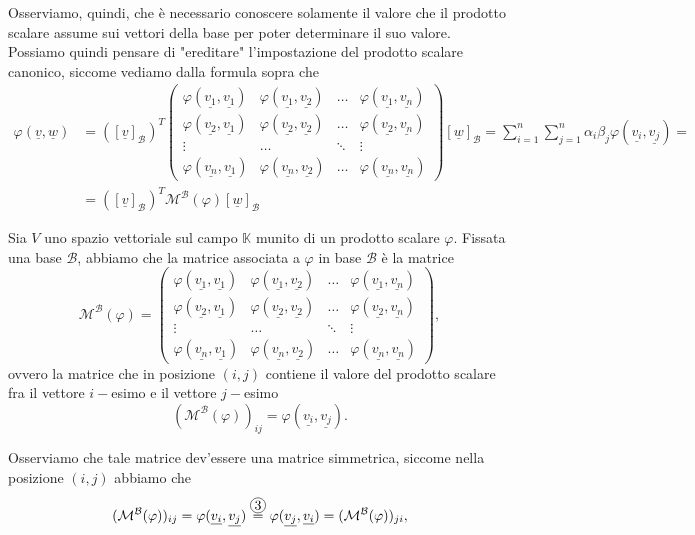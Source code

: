 Osserviamo, quindi, che è necessario conoscere solamente il valore che il prodotto scalare assume sui vettori della base per poter determinare il suo valore. Possiamo quindi pensare di "ereditare" l'impostazione del prodotto scalare canonico, siccome vediamo dalla formula sopra che
\begin{align}
	\varphi(\underline{v}, \underline{w}) &= ([\underline{v}]_\mathcal{B})^T \begin{pmatrix}
		\varphi(\underline{v_1}, \underline{v_1}) & \varphi(\underline{v_1}, \underline{v_2}) & \ldots & \varphi(\underline{v_1}, \underline{v_n}) \\
		\varphi(\underline{v_2}, \underline{v_1}) & \varphi(\underline{v_2}, \underline{v_2}) & \ldots & \varphi(\underline{v_2}, \underline{v_n}) \\
		\vdots & \ldots & \ddots & \vdots \\
		\varphi(\underline{v_n}, \underline{v_1}) & \varphi(\underline{v_n}, \underline{v_2}) & \ldots & \varphi(\underline{v_n}, \underline{v_n})
	\end{pmatrix} [\underline{w}]_\mathcal{B} = \sum_{i=1}^n \sum_{j=1}^n \alpha_i \beta_j \varphi(\underline{v_i}, \underline{v_j}) = \\
	&= ([\underline{v}]_\mathcal{B})^T \mathcal{M}^\mathcal{B}(\varphi) [\underline{w}]_\mathcal{B}
\end{align}
\begin{definition}
	Sia $V$ uno spazio vettoriale sul campo $\mathbb{K}$ munito di un prodotto scalare $\varphi$. Fissata una base $\mathcal{B}$, abbiamo che la matrice associata a $\varphi$ in base $\mathcal{B}$ è la matrice
	$$
	\mathcal{M}^\mathcal{B}(\varphi) = \begin{pmatrix}
		\varphi(\underline{v_1}, \underline{v_1}) & \varphi(\underline{v_1}, \underline{v_2}) & \ldots & \varphi(\underline{v_1}, \underline{v_n}) \\
		\varphi(\underline{v_2}, \underline{v_1}) & \varphi(\underline{v_2}, \underline{v_2}) & \ldots & \varphi(\underline{v_2}, \underline{v_n}) \\
		\vdots & \ldots & \ddots & \vdots \\
		\varphi(\underline{v_n}, \underline{v_1}) & \varphi(\underline{v_n}, \underline{v_2}) & \ldots & \varphi(\underline{v_n}, \underline{v_n})
	\end{pmatrix}, 
	$$
	ovvero la matrice che in posizione $(i, j)$ contiene il valore del prodotto scalare fra il vettore $i-$esimo e il vettore $j-$esimo
	$$
		(\mathcal{M}^\mathcal{B}(\varphi))_{ij} = \varphi(\underline{v_i}, \underline{v_j}). 
	$$
\end{definition}
Osserviamo che tale matrice dev'essere una matrice simmetrica, siccome nella posizione $(i,j)$ abbiamo che
$$
	(\mathcal{M}^{\mathcal{B}}(\varphi))_{ij} = \varphi(\underline{v_i}, \underline{v_j}) \stackrel{\circled{3}}{=} \varphi(\underline{v_j}, \underline{v_i}) = (\mathcal{M}^{\mathcal{B}}(\varphi))_{ji},
$$

